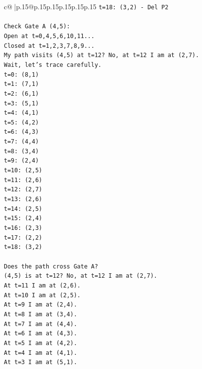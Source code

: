 \documentclass{article}
\begin{document}
{\begin{supertabular}{c@{$\;$}|p{.15\linewidth}@{}p{.15\linewidth}p{.15\linewidth}p{.15\linewidth}p{.15\linewidth}p{.15\linewidth}}
{{{\texttt{t=18: (3,2) {-} Del P2} \\
\\ 
\texttt{Check Gate A (4,5):} \\
\texttt{Open at t=0,4,5,6,10,11...} \\
\texttt{Closed at t=1,2,3,7,8,9...} \\
\texttt{My path visits (4,5) at t=12? No, at t=12 I am at (2,7).} \\
\texttt{Wait, let's trace carefully.} \\
\texttt{t=0: (8,1)} \\
\texttt{t=1: (7,1)} \\
\texttt{t=2: (6,1)} \\
\texttt{t=3: (5,1)} \\
\texttt{t=4: (4,1)} \\
\texttt{t=5: (4,2)} \\
\texttt{t=6: (4,3)} \\
\texttt{t=7: (4,4)} \\
\texttt{t=8: (3,4)} \\
\texttt{t=9: (2,4)} \\
\texttt{t=10: (2,5)} \\
\texttt{t=11: (2,6)} \\
\texttt{t=12: (2,7)} \\
\texttt{t=13: (2,6)} \\
\texttt{t=14: (2,5)} \\
\texttt{t=15: (2,4)} \\
\texttt{t=16: (2,3)} \\
\texttt{t=17: (2,2)} \\
\texttt{t=18: (3,2)} \\
\\ 
\texttt{Does the path cross Gate A?} \\
\texttt{(4,5) is at t=12? No, at t=12 I am at (2,7).} \\
\texttt{At t=11 I am at (2,6).} \\
\texttt{At t=10 I am at (2,5).} \\
\texttt{At t=9 I am at (2,4).} \\
\texttt{At t=8 I am at (3,4).} \\
\texttt{At t=7 I am at (4,4).} \\
\texttt{At t=6 I am at (4,3).} \\
\texttt{At t=5 I am at (4,2).} \\
\texttt{At t=4 I am at (4,1).} \\
\texttt{At t=3 I am at (5,1).} \\
}}}
\end{supertabular}}
\end{document}
